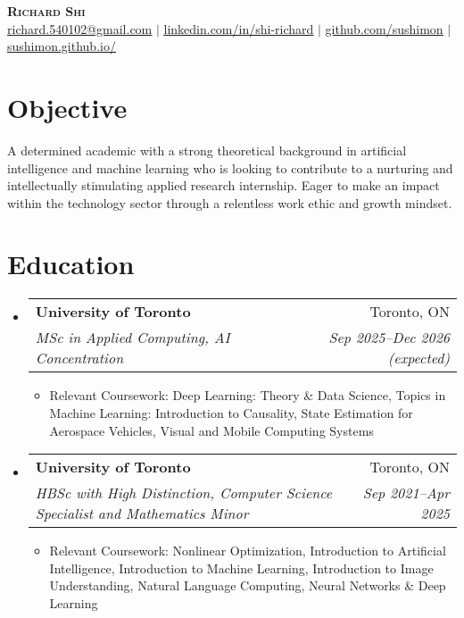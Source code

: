 \documentclass[letterpaper,11pt]{article}
\makeatletter
\newcommand{\resumeItem}[1]{
  \item\small{
    {#1 \vspace{-2pt}}
  }
}
\newcommand{\resumeSubheading}[4]{
  \vspace{-2pt}\item
    \begin{tabular*}{0.97\textwidth}[t]{l@{\extracolsep{\fill}}r}
      \textbf{#1} & #2 \\
      \textit{\small#3} & \textit{\small #4} \\
    \end{tabular*}\vspace{-7pt}
}
\newcommand{\resumeSubHeadingListStart}{\begin{itemize}[leftmargin=0.15in, label={}]}
\newcommand{\resumeSubHeadingListEnd}{\end{itemize}}
\newcommand{\resumeItemListStart}{\begin{itemize}}
\newcommand{\resumeItemListEnd}{\end{itemize}\vspace{-5pt}}
\makeatother
\begin{document}

\begin{center}
    \textbf{\Huge \scshape Richard Shi} \\ \vspace{1pt}
    \small \href{mailto:richard.540102@gmail.com}{\underline{richard.540102@gmail.com}} $|$ 
    \href{https://www.linkedin.com/in/shi-richard/}{\underline{linkedin.com/in/shi-richard}} $|$
    \href{https://github.com/sushimon}{\underline{github.com/sushimon}}
    $|$ \href{https://sushimon.github.io/}{\underline{sushimon.github.io/}}
\end{center}


\section{Objective}
  \begin{adjustwidth}{0.15in}{}
    A determined academic with a strong theoretical background in artificial intelligence and machine learning who is looking to contribute to a nurturing and intellectually stimulating applied research internship. Eager to make an impact within the technology sector through a relentless work ethic and growth mindset.
  \end{adjustwidth}


\section{Education}
  \resumeSubHeadingListStart
      \resumeSubheading{University of Toronto}{Toronto, ON}{MSc in Applied Computing, AI Concentration}{Sep 2025--Dec 2026 (expected)}
      \resumeItemListStart
        \resumeItem{Relevant Coursework: Deep Learning: Theory \& Data Science, Topics in Machine Learning: Introduction to Causality, State Estimation for Aerospace Vehicles, Visual and Mobile Computing Systems }
      \resumeItemListEnd

      \resumeSubheading{University of Toronto}{Toronto, ON}{HBSc with High Distinction, Computer Science Specialist and Mathematics Minor}{Sep 2021--Apr 2025}
      \resumeItemListStart
        \resumeItem{Relevant Coursework: Nonlinear Optimization, Introduction to Artificial Intelligence, Introduction to Machine Learning, Introduction to Image Understanding, Natural Language Computing, Neural Networks \& Deep Learning}
      \resumeItemListEnd
  \resumeSubHeadingListEnd
\end{document}
